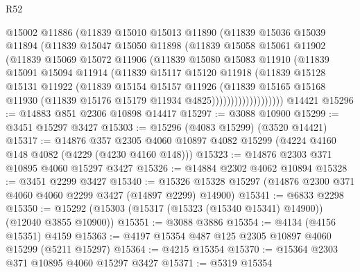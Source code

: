 \begin{lexlean}{R52}
\begin{coremodule}
                  @15002
                  @11886
                  (@11839
                    @15010
                    @15013
                    @11890
                    (@11839
                      @15036
                      @15039
                      @11894
                      (@11839
                        @15047
                        @15050
                        @11898
                        (@11839
                          @15058
                          @15061
                          @11902
                          (@11839
                            @15069
                            @15072
                            @11906
                            (@11839
                              @15080
                              @15083
                              @11910
                              (@11839
                                @15091
                                @15094
                                @11914
                                (@11839
                                  @15117
                                  @15120
                                  @11918
                                  (@11839
                                    @15128
                                    @15131
                                    @11922
                                    (@11839
                                      @15154
                                      @15157
                                      @11926
                                      (@11839
                                        @15165
                                        @15168
                                        @11930
                                        (@11839 @15176 @15179 @11934 @4825)))))))))))))))))))
    @14421
@15296 := @14883 @851 @2306 @10898 @14417
@15297 := @3088 @10900
@15299 := @3451 @15297 @3427
@15303 := @15296 (@4083 @15299) (@3520 @14421)
@15317 := @14876
    @357
    @2305
    @4060
    @10897
    @4082
    @15299
    (@4224 @4160 @148 @4082 (@4229 (@4230 @4160 @148)))
@15323 := @14876 @2303 @371 @10895 @4060 @15297 @3427
@15326 := @14884 @2302 @4062 @10894
@15328 := @3451 @2299 @3427
@15340 := @15326 @15328 @15297 (@14876 @2300 @371 @4060 @4060 @2299 @3427 (@14897 @2299) @14900)
@15341 := @6833 @2298
@15350 := @15292 (@15303 (@15317 (@15323 (@15340 @15341) @14900)) (@12040 @3855 @10900))
@15351 := @3088 @3886
@15354 := @4134 (@4156 @15351) @4159
@15363 := @4197 @15354 @487 @125 @2305 @10897 @4060 @15299 (@5211 @15297)
@15364 := @4215 @15354
@15370 := @15364 @2303 @371 @10895 @4060 @15297 @3427
@15371 := @5319 @15354

\end{coremodule}
\end{lexlean}
